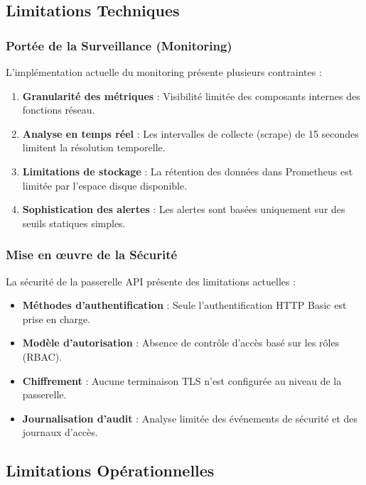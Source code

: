 \documentclass[12pt,a4paper]{report}
\begin{document}
\subsection{Limitations Techniques}

\subsubsection{Portée de la Surveillance (Monitoring)}

L'implémentation actuelle du monitoring présente plusieurs contraintes :

\begin{enumerate}
    \item \textbf{Granularité des métriques} : Visibilité limitée des composants internes des fonctions réseau.
    \item \textbf{Analyse en temps réel} : Les intervalles de collecte (scrape) de 15 secondes limitent la résolution temporelle.
    \item \textbf{Limitations de stockage} : La rétention des données dans Prometheus est limitée par l'espace disque disponible.
    \item \textbf{Sophistication des alertes} : Les alertes sont basées uniquement sur des seuils statiques simples.
\end{enumerate}

\subsubsection{Mise en œuvre de la Sécurité}

La sécurité de la passerelle API présente des limitations actuelles :

\begin{itemize}
    \item \textbf{Méthodes d'authentification} : Seule l'authentification HTTP Basic est prise en charge.
    \item \textbf{Modèle d'autorisation} : Absence de contrôle d'accès basé sur les rôles (RBAC).
    \item \textbf{Chiffrement} : Aucune terminaison TLS n'est configurée au niveau de la passerelle.
    \item \textbf{Journalisation d'audit} : Analyse limitée des événements de sécurité et des journaux d'accès.
\end{itemize}

\subsection{Limitations Opérationnelles}
\end{document}
